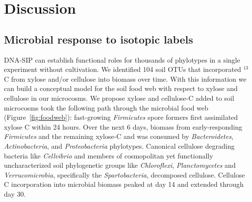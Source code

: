 \section{Discussion} 
\subsection{Microbial response to isotopic labels}
DNA-SIP can establish functional roles for thousands of phylotypes in a single
experiment without cultivation. We identified 104 soil OTUs that incorporated
$^{13}$C from xylose and/or cellulose into biomass over time. With this
information we can build a conceptual model for the soil food web with respect
to xylose and cellulose in our microcosms. We propose xylose and
cellulose-C added to soil microcosms took the following path through the
microbial food web (Figure~\ref{fig:foodweb}): fast-growing \textit{Firmicutes}
spore formers first assimilated xylose C within 24 hours. Over the next
6 days, biomass from early-responding \textit{Firmicutes} and the remaining
xylose-C and  was consumed by \textit{Bacteroidetes},
\textit{Actinobacteria}, and \textit{Proteobacteria} phylotypes. Canonical
cellulose degrading bacteria like \textit{Cellvibrio} and members of
cosmopolitan yet functionally uncharacterized soil phylogenetic groups like
\textit{Chloroflexi}, \textit{Planctomycetes} and \textit{Verrucomicrobia},
specifically the \textit{Spartobacteria}, decomposed cellulose. Cellulose
C incorporation into microbial biomass peaked at day 14 and extended through
day 30.

